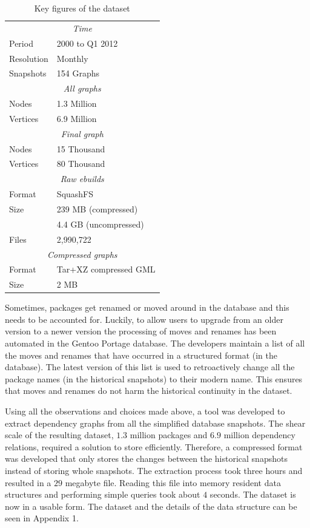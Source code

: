 \documentclass[smallextended,final]{svjour3}
\begin{document}
\begin{table}
\vspace{-1em}
\small\centering
\caption{Key figures of the dataset}\label{tbl:dataset}
\begin{tabular}{ll}
\toprule
\multicolumn{2}{c}{\emph{Time}} \\[0.5mm]
Period & 2000 to Q1 2012 \\
Resolution & Monthly \\
Snapshots & 154 Graphs \\
\midrule
\multicolumn{2}{c}{\emph{All graphs}} \\[0.5mm]
Nodes & 1.3 Million \\
Vertices & 6.9 Million \\
\midrule
\multicolumn{2}{c}{\emph{Final graph}} \\[0.5mm]
Nodes & 15 Thousand \\
Vertices & 80 Thousand \\
\midrule
\multicolumn{2}{c}{\emph{Raw ebuilds}} \\[0.5mm]
Format & SquashFS \\
Size & 239 MB (compressed) \\
 & 4.4 GB (uncompressed) \\
Files & 2,990,722 \\
\midrule
\multicolumn{2}{c}{\emph{Compressed graphs}} \\[0.5mm]
Format & Tar+XZ compressed GML \\
Size & 2 MB \\
\bottomrule
\end{tabular}
\vspace{-1em}
\end{table}

Sometimes, packages get renamed or moved around in the database and this needs to be accounted for. Luckily, to allow users to upgrade from an older version to a newer version the processing of moves and renames has been automated in the Gentoo Portage database. The developers maintain a list of all the moves and renames that have occurred in a structured format (in the database). The latest version of this list is used to retroactively change all the package names (in the historical snapshots) to their modern name. This ensures that moves and renames do not harm the historical continuity in the dataset.

Using all the observations and choices made above, a tool was developed to extract dependency graphs from all the simplified database snapshots. The shear scale of the resulting dataset, $1.3$ million packages and $6.9$ million dependency relations, required a solution to store efficiently. Therefore, a compressed format was developed that only stores the changes between the historical snapshots instead of storing whole snapshots. The extraction process took three hours and resulted in a $29$ megabyte file. Reading this file into memory resident data structures and performing simple queries took about $4$ seconds. The dataset is now in a usable form. The dataset and the details of the data structure can be seen in Appendix 1.
\end{document}
